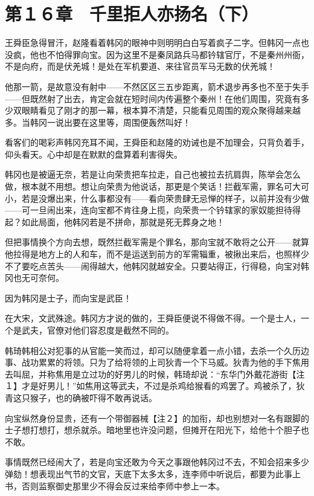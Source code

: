 \section{第１６章　千里拒人亦扬名（下）}

王舜臣急得冒汗，赵隆看着韩冈的眼神中则明明白白写着疯子二字。但韩冈一点也没疯，他也不怕得罪向宝。因为这里不是秦凤路兵马都钤辖官厅，不是秦州州衙，不是向府，而是伏羌城！是处在军机要道、来往官员军马无数的伏羌城！

他那一箭，是故意没有射中——不然区区三五步距离，箭术退步再多也不至于失手——但既然射了出去，肯定会就在短时间内传遍整个秦州！在他们周围，究竟有多少双眼睛看见了刚才的那一幕，根本算不清楚，只能看见周围的观众聚得越来越多。当韩冈一说出要在这里等，周围便轰然叫好！

看客们的喝彩声韩冈充耳不闻，王舜臣和赵隆的劝诫也是不加理会，只背负着手，仰头看天。心中却是在默默的盘算着利害得失。

韩冈也是被逼无奈，若是让向荣贵把车拉走，自己也被拉去抗肩舆，陈举会怎么做，根本就不用想。想让向荣贵为他说话，那更是个笑话！拦截军需，罪名可大可小，若是没爆出来，什么事都没有——看向荣贵肆无忌惮的样子，以前并没有少做——可一旦闹出来，连向宝都不肯往身上揽，向荣贵一个钤辖家的家奴能担待得起？如此局面，他韩冈若是不拼命，那就是死无葬身之地！

但把事情换个方向去想，既然拦截军需是个罪名，那向宝就不敢将之公开——就算他拉得是地方上的人和车，而不是运送到前方的军需辎重，被揪出来后，也照样少不了要吃点苦头——闹得越大，他韩冈就越安全。只要站得正，行得稳，向宝对韩冈也无可奈何。

因为韩冈是士子，而向宝是武臣！

在大宋，文武殊途。韩冈方才说的做的，王舜臣便说不得做不得。一个是士人，一个是武夫，官僚对他们容忍度是截然不同的。

韩琦韩相公对犯事的从官能一笑而过，却可以随便拿着一点小错，去杀一个久历边事、战功累累的将领。只为了给将领的上司狄青一个下马威。狄青为他的手下焦用去叫屈，并称焦用是立过功的好男儿的时候，韩琦却说：“东华门外戴花游街【注１】才是好男儿！”如焦用这等武夫，不过是杀鸡给猴看的鸡罢了。鸡被杀了，狄青这只猴子，也的确被吓得不敢再说话。

向宝纵然身份显贵，还有一个带御器械【注２】的加衔，却也别想对一名有跟脚的士子想打想打，想杀就杀。暗地里也许没问题，但摊开在阳光下，给他十个胆子也不敢。

事情既然已经闹大了，若是向宝还敢为今天之事跟他韩冈过不去，不知会招来多少弹劾！想表现出气节的文官，天底下太多太多，连李师中听说后，都要为此事上书，否则监察御史那里少不得会反过来给李师中参上一本。

